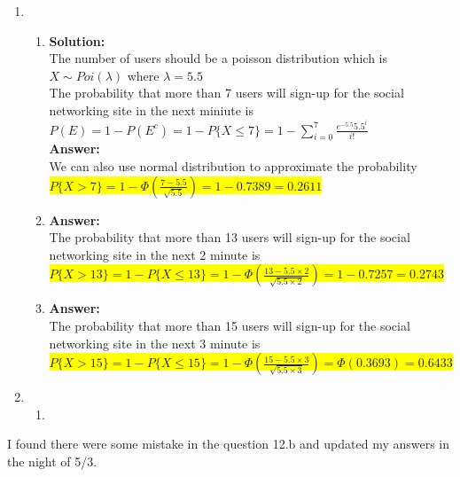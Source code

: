 \documentclass{article}
\newcommand{\myansw}{\textbf{Answer:}\\}
\newcommand{\mysolu}{\textbf{Solution:}\\}
\begin{document}
\thispagestyle{fancy} %

\begin{enumerate}
	\item
	\begin{enumerate}
		\item
		\mysolu
		The number of users should be a poisson distribution which is\\
		${X \sim Poi(\lambda)}$ where ${\lambda = 5.5}$\\
		The probability that more than 7 users will sign-up for the social networking site in the next miniute is\\
		${P(E) = 1 - P(E^c) = 1 - P\{X \leq 7\} = 1 - \sum\limits_{i = 0}^7 \frac{e^{-5.5}5.5^i}{i!}}$\\
		\myansw
		We can also use normal distribution to approximate the probability\\
		\colorbox{yellow}{${P\{X > 7\} = 1 - \Phi(\frac{7-5.5}{\sqrt{5.5}}) = 1 - 0.7389 = 0.2611 }$}\\
		
		\item
		\myansw
		The probability that more than 13 users will sign-up for the social networking site in the next 2 minute is\\
		\colorbox{yellow}{${P\{X > 13\} = 1 - P\{X \leq 13\} = 1 - \Phi(\frac{13 - 5.5\times2}{\sqrt{5.5 \times 2}}) = 1 - 0.7257 = 0.2743}$}\\
		
		\item
		\myansw
		The probability that more than 15 users will sign-up for the social networking site in the next 3 minute is\\
		\colorbox{yellow}{${P\{X > 15\} = 1 - P\{X \leq 15\} = 1 - \Phi(\frac{15 - 5.5\times3}{\sqrt{5.5 \times 3}}) = \Phi(0.3693) = 0.6433}$}\\		
		
	\end{enumerate}
	\item 
	\begin{enumerate}
		\item
		
		
	\end{enumerate}
\end{enumerate}


\newpage
I found there were some mistake in the question 12.b and updated my answers in the night of 5/3.
\end{document}
